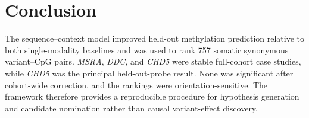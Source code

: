 \documentclass[10pt,letterpaper,twocolumn]{article}
\begin{document}
\section{Conclusion}

The sequence--context model improved held-out methylation prediction
relative to both single-modality baselines and was used to rank 757
somatic synonymous variant--CpG pairs. \textit{MSRA}, \textit{DDC},
and \textit{CHD5} were stable full-cohort case studies, while
\textit{CHD5} was the principal held-out-probe result. None was
significant after cohort-wide correction, and the rankings were
orientation-sensitive. The framework therefore provides a reproducible
procedure for hypothesis generation and candidate nomination rather
than causal variant-effect discovery.



\end{document}
